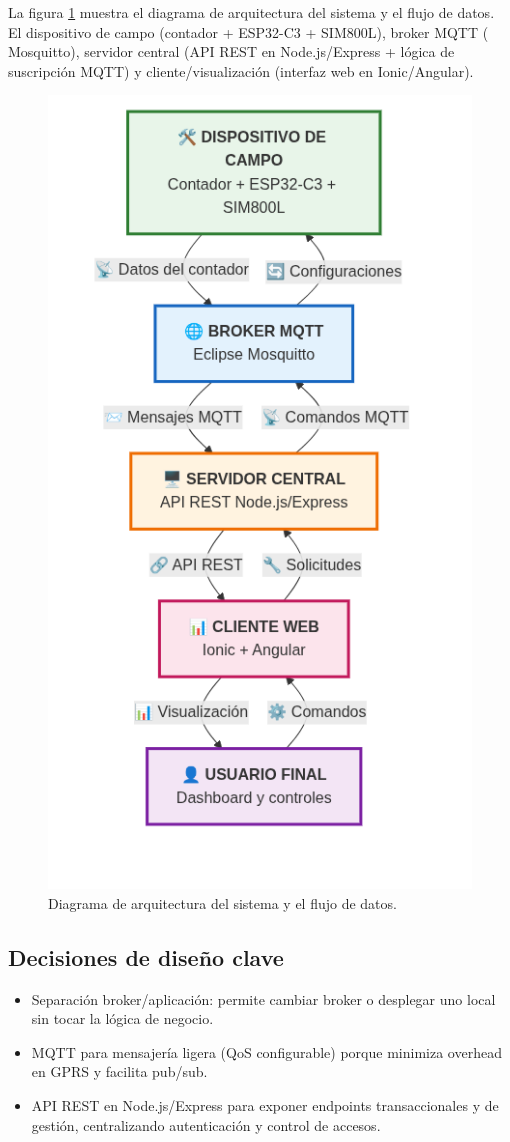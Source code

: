 La figura \ref{fig:diag_arquitectura} muestra el diagrama de arquitectura del sistema y el flujo de datos. 
El dispositivo de campo (contador + ESP32-C3 + SIM800L), broker MQTT ( Mosquitto),  servidor central (API REST en Node.js/Express + lógica de suscripción MQTT) y  cliente/visualización (interfaz web en Ionic/Angular).


\begin{figure}[htbp]
  \centering
  \includegraphics[width=0.4\linewidth]{./Figures/diagArq.png}
  \caption{Diagrama de arquitectura del sistema y el flujo de datos.}
  \label{fig:diag_arquitectura}
\end{figure}


\subsection{Decisiones de diseño clave}

\begin{itemize}

\item Separación broker/aplicación: permite cambiar broker o desplegar uno local sin tocar la lógica de negocio.

\item MQTT para mensajería ligera (QoS configurable) porque minimiza overhead en GPRS y facilita pub/sub.

\item API REST en Node.js/Express para exponer endpoints transaccionales y de gestión, centralizando autenticación y control de accesos.
\end{itemize}









